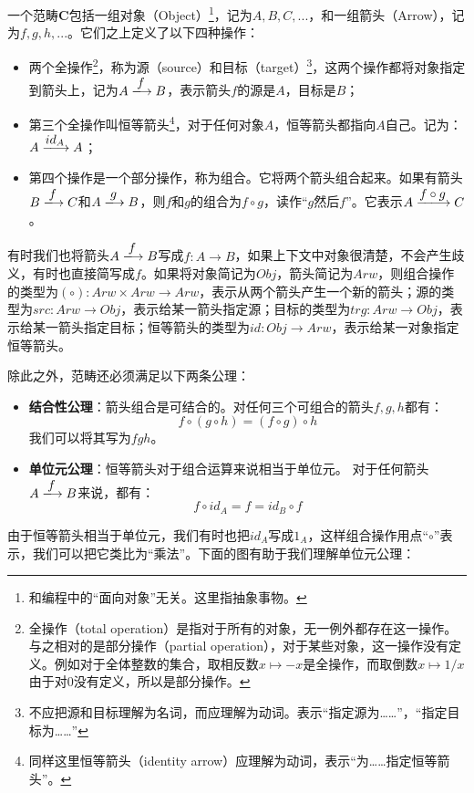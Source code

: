 \documentclass{article}
\begin{document}
\begin{definition}
一个范畴$\pmb{C}$包括一组对象（Object）\footnote{和编程中的“面向对象”无关。这里指抽象事物。}，记为$A, B, C, ...$，和一组箭头（Arrow），记为$f, g, h, ...$。它们之上定义了以下四种操作：
\begin{itemize}
\item 两个全操作\footnote{全操作（total operation）是指对于所有的对象，无一例外都存在这一操作。与之相对的是部分操作（partial operation），对于某些对象，这一操作没有定义。例如对于全体整数的集合，取相反数$x \mapsto -x$是全操作，而取倒数$x \mapsto 1/x$由于对0没有定义，所以是部分操作。}，称为源（source）和目标（target）\footnote{不应把源和目标理解为名词，而应理解为动词。表示“指定源为……”，“指定目标为……”}，这两个操作都将对象指定到箭头上，记为$A \arrowto{f} B$，表示箭头$f$的源是$A$，目标是$B$；
\item 第三个全操作叫恒等箭头\footnote{同样这里恒等箭头（identity arrow）应理解为动词，表示“为……指定恒等箭头”。}，对于任何对象$A$，恒等箭头都指向$A$自己。记为：$A \arrowto{id_A} A$；
\item 第四个操作是一个部分操作，称为组合。它将两个箭头组合起来。如果有箭头$B \arrowto{f} C$和$A \arrowto{g} B$，则$f$和$g$的组合为$f \circ g$，读作“$g$然后$f$”。它表示$A \arrowto{f \circ g} C$。
\end{itemize}

有时我们也将箭头$A \arrowto{f} B$写成$f: A \to B$，如果上下文中对象很清楚，不会产生歧义，有时也直接简写成$f$。如果将对象简记为$Obj$，箭头简记为$Arw$，则组合操作的类型为$(\circ) : Arw \times Arw \to Arw$，表示从两个箭头产生一个新的箭头；源的类型为$src: Arw \to Obj$，表示给某一箭头指定源；目标的类型为$trg: Arw \to Obj$，表示给某一箭头指定目标；恒等箭头的类型为$id: Obj \to Arw$，表示给某一对象指定恒等箭头。

除此之外，范畴还必须满足以下两条公理：

\begin{itemize}
\item \textbf{结合性公理}：箭头组合是可结合的。对任何三个可组合的箭头$f, g, h$都有：
\[
f \circ (g \circ h) = (f \circ g) \circ h
\]
我们可以将其写为$f g h$。
\item \textbf{单位元公理}：恒等箭头对于组合运算来说相当于单位元。
对于任何箭头$A \arrowto{f} B$来说，都有：
\[
f \circ id_A = f = id_B \circ f
\]
\end{itemize}
\end{definition}

由于恒等箭头相当于单位元，我们有时也把$id_A$写成$1_A$，这样组合操作用点“$\circ$”表示，我们可以把它类比为“乘法”。下面的图有助于我们理解单位元公理：
\end{document}
